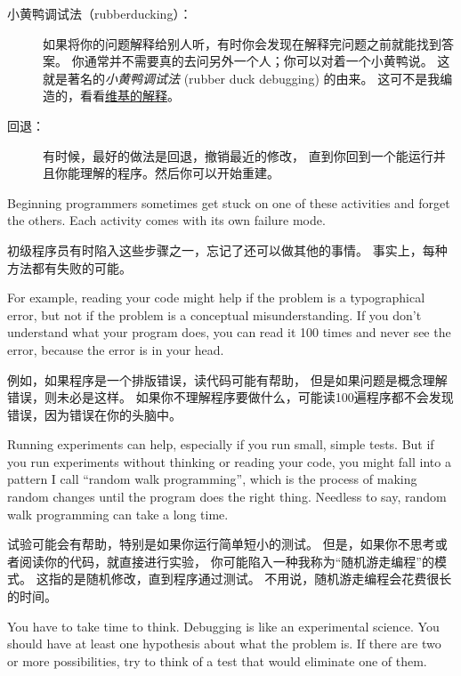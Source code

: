 {\begin{description}
\item [小黄鸭调试法（rubberducking）：]如果将你的问题解释给别人听，有时你会发现在解释完问题之前就能找到答案。
    你通常并不需要真的去问另外一个人；你可以对着一个小黄鸭说。
    这就是著名的{\em 小黄鸭调试法} (rubber duck
    debugging) 的由来。 这可不是我编造的，看看\href{https://en.wikipedia.org/wiki/Rubber_duck_debugging}{维基的解释}。

\item [回退：]有时候，最好的做法是回退，撤销最近的修改，
    直到你回到一个能运行并且你能理解的程序。然后你可以开始重建。

\end{description}


Beginning programmers sometimes get stuck on one of these activities
and forget the others.  Each activity comes with its own failure
mode.

初级程序员有时陷入这些步骤之一，忘记了还可以做其他的事情。
事实上，每种方法都有失败的可能。


For example, reading your code might help if the problem is a
typographical error, but not if the problem is a conceptual
misunderstanding.  If you don't understand what your program does, you
can read it 100 times and never see the error, because the error is in
your head.

例如，如果程序是一个排版错误，读代码可能有帮助，
但是如果问题是概念理解错误，则未必是这样。
如果你不理解程序要做什么，可能读100遍程序都不会发现错误，因为错误在你的头脑中。


Running experiments can help, especially if you run small, simple
tests.  But if you run experiments without thinking or reading your
code, you might fall into a pattern I call ``random walk programming'',
which is the process of making random changes until the program
does the right thing.  Needless to say, random walk programming
can take a long time.

试验可能会有帮助，特别是如果你运行简单短小的测试。
但是，如果你不思考或者阅读你的代码，就直接进行实验，
你可能陷入一种我称为“随机游走编程”的模式。
这指的是随机修改，直到程序通过测试。
不用说，随机游走编程会花费很长的时间。


You have to take time to think.  Debugging is like an
experimental science.  You should have at least one hypothesis about
what the problem is.  If there are two or more possibilities, try to
think of a test that would eliminate one of them.

}
